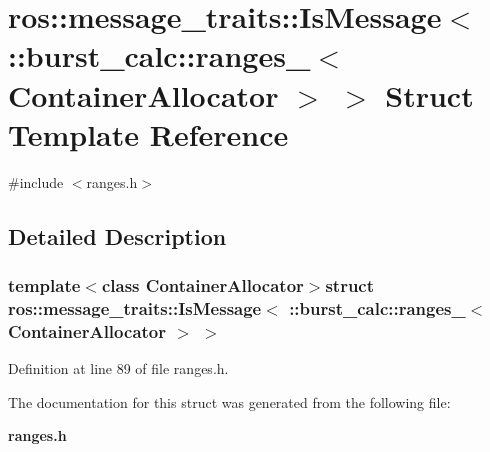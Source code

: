 \section{ros\-:\-:message\-\_\-traits\-:\-:\-Is\-Message$<$ \-:\-:burst\-\_\-calc\-:\-:ranges\-\_\-$<$ \-Container\-Allocator $>$ $>$ \-Struct \-Template \-Reference}
\label{structros_1_1message__traits_1_1IsMessage_3_01_1_1burst__calc_1_1ranges___3_01ContainerAllocator_01_4_01_4}


{\ttfamily \#include $<$ranges.\-h$>$}



\subsection{\-Detailed \-Description}
\subsubsection*{template$<$class Container\-Allocator$>$struct ros\-::message\-\_\-traits\-::\-Is\-Message$<$ \-::burst\-\_\-calc\-::ranges\-\_\-$<$ Container\-Allocator $>$ $>$}



\-Definition at line 89 of file ranges.\-h.



\-The documentation for this struct was generated from the following file\-:\begin{DoxyCompactItemize}
\item 
{\bf ranges.\-h}\end{DoxyCompactItemize}
